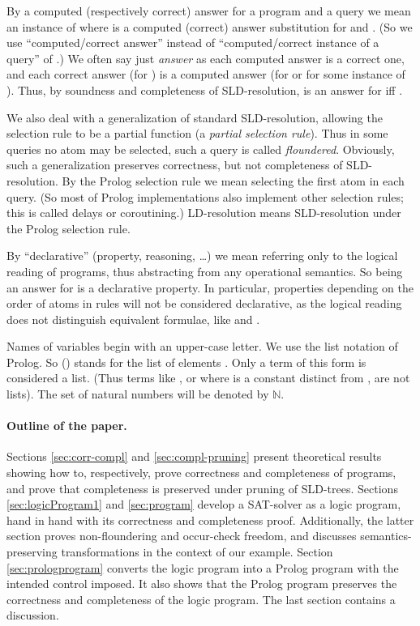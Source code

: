 \documentclass{tlp}
\newcommand*{\NN}{{\ensuremath{\mathbb{N}}}\xspace}
\begin{document}
  By a computed (respectively correct) answer for a program  and a
  query  we mean an instance  of  where  is a computed
  (correct) answer substitution \cite{Apt-Prolog} for  and .
(So we use ``computed/correct answer'' instead of
 ``computed/correct instance of a query'' of \cite{Apt-Prolog}.)
  We often say just
   {\em answer}
as each computed answer is a correct one, 
and each correct answer (for ) is a computed answer
(for  or for some instance of ).
  Thus, by soundness and completeness of SLD-resolution,
   is an answer for  iff .


We also deal with a generalization of standard 
SLD-resolution, allowing the selection rule to be a partial function
(a {\em partial selection rule}).
Thus in some queries no atom may be selected, 
such a query is called {\em floundered}.
Obviously, such a generalization preserves correctness, but not completeness of
SLD-resolution. 
By the Prolog selection rule we mean selecting the first atom in each query.
(So most of Prolog implementations also implement other selection rules; this
is called delays or coroutining.)
LD-resolution means SLD-resolution under the Prolog selection rule.


By ``declarative'' (property, reasoning, \ldots) 
we mean referring only to the logical reading of programs, 
thus abstracting from any operational semantics.
So  being an answer for  is a declarative property.
In particular,
properties depending on the order of atoms in rules will not be considered
declarative, as the logical reading does not distinguish equivalent formulae,
like 
 and .


  Names of variables begin with an upper-case letter.
  We use the list notation of Prolog.  So 
    () stands for the list of elements .
  Only a term of this form is considered a list.
(Thus terms like , or   where  is a constant distinct
  from , are not lists).
The set of natural numbers will be denoted by \NN.

\paragraph{Outline of the paper.}
Sections \ref{sec:corr-compl} and \ref{sec:compl-pruning}
present theoretical results showing how to, respectively, prove correctness
and completeness of programs, and prove that completeness is preserved under
pruning of SLD-trees.
Sections \ref{sec:logicProgram1} and
\ref{sec:program}
develop a SAT-solver as a logic program, hand in hand with its correctness
and completeness proof.
Additionally, the latter section proves non-floundering and occur-check
freedom, and discusses semantics-preserving transformations in the context
of our example.
Section \ref{sec:prologprogram}
converts the logic program into a Prolog program with the intended control
imposed.  It also shows that the Prolog program preserves the correctness and
completeness of the logic program.
The last section contains a discussion.
\end{document}
